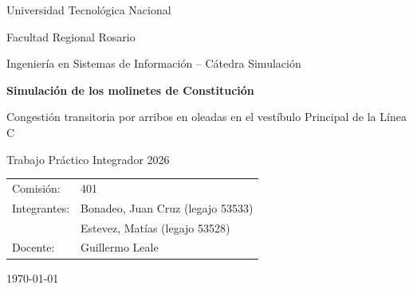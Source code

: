 \begin{titlepage}
  \centering
  {\large Universidad Tecnológica Nacional\par}
  {\large Facultad Regional Rosario\par}
  \vspace{0.4cm}
  {Ingeniería en Sistemas de Información -- Cátedra Simulación\par}
  \vfill
  {\LARGE\bfseries Simulación de los molinetes de Constitución\par}
  \vspace{0.4cm}
  {\large Congestión transitoria por arribos en oleadas en el vestíbulo Principal de la Línea C\par}
  \vspace{0.6cm}
  {Trabajo Práctico Integrador 2026\par}
  \vfill
  \begin{tabular}{ll}
    Comisión: & 401 \\
    Integrantes: & Bonadeo, Juan Cruz (legajo 53533) \\
                 & Estevez, Matías (legajo 53528) \\
    Docente: & Guillermo Leale \\
  \end{tabular}
  \vfill
  {\today\par}
\end{titlepage}
